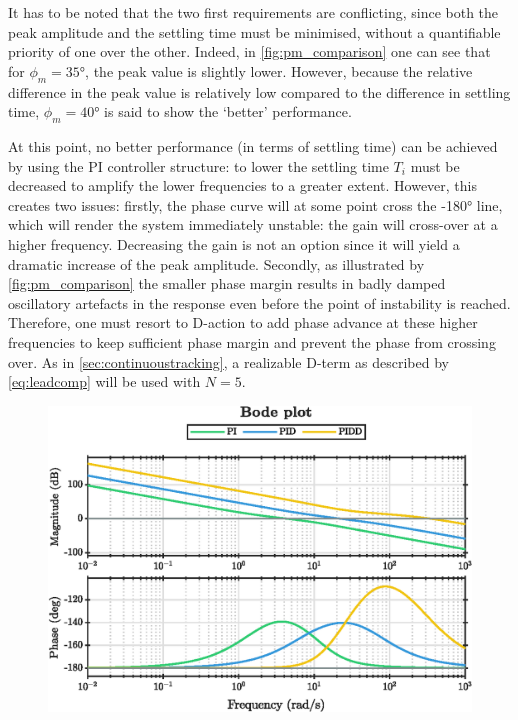 It has to be noted that the two first requirements are conflicting, since both the peak amplitude and the settling time must be minimised, without a quantifiable priority of one over the other. Indeed, in \cref{fig:pm_comparison} one can see that for $\phi_m = \ang{35}$, the peak value is slightly lower. However, because the relative difference in the peak value is relatively low compared to the difference in settling time, $\phi_m = \ang{40}$ is said to show the `better' performance.

At this point, no better performance (in terms of settling time) can be achieved by using the PI controller structure: to lower the settling time $T_i$ must be decreased to amplify the lower frequencies to a greater extent. However, this creates two issues: firstly, the phase curve will at some point cross the \ang{-180} line, which will render the system immediately unstable: the gain will cross-over at a higher frequency. Decreasing the gain is not an option since it will yield a dramatic increase of the peak amplitude. Secondly, as illustrated by \cref{fig:pm_comparison} the smaller phase margin results in badly damped oscillatory artefacts in the response even before the point of instability is reached. Therefore, one must resort to D-action to add phase advance at these higher frequencies to keep sufficient phase margin and prevent the phase from crossing over. As in \cref{sec:continuoustracking}, a realizable D-term as described by \cref{eq:leadcomp} will be used with $N = 5$. 
\begin{figure}[ht]
    \centering
    \includegraphics[]{media/q2/pi_bode_comparison.eps}
    \caption{}
    \label{fig:q2_bode_comparison}
\end{figure}
